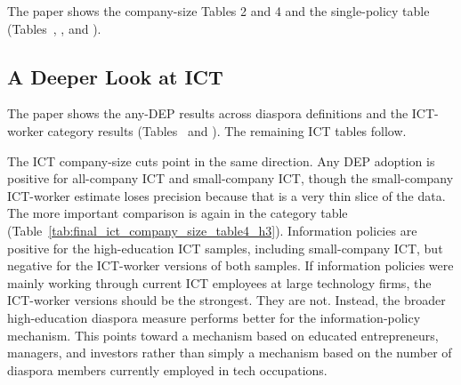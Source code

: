 \documentclass[12pt]{article}
\let\oldsubsection\subsection
\renewcommand{\subsection}{\FloatBarrier\oldsubsection}
\begin{document}
The paper shows the company-size Tables 2 and 4 and the single-policy table (Tables~, , and ).

\FloatBarrier
\subsection{A Deeper Look at ICT} \label{ss:ict}

The paper shows the any-DEP results across diaspora definitions and the ICT-worker category results (Tables~ and ). The remaining ICT tables follow.









The ICT company-size cuts point in the same direction. Any DEP adoption is positive for all-company ICT and small-company ICT, though the small-company ICT-worker estimate loses precision because that is a very thin slice of the data. The more important comparison is again in the category table (Table~\ref{tab:final_ict_company_size_table4_h3}). Information policies are positive for the high-education ICT samples, including small-company ICT, but negative for the ICT-worker versions of both samples. If information policies were mainly working through current ICT employees at large technology firms, the ICT-worker versions should be the strongest. They are not. Instead, the broader high-education diaspora measure performs better for the information-policy mechanism. This points toward a mechanism based on educated entrepreneurs, managers, and investors rather than simply a mechanism based on the number of diaspora members currently employed in tech occupations.



\end{document}
